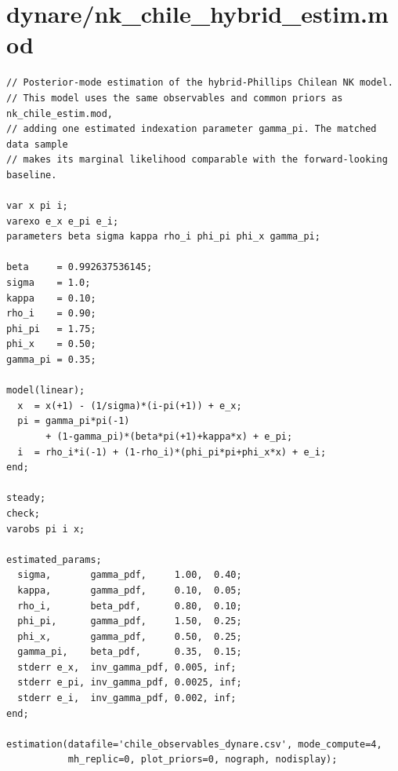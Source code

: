 \documentclass[9pt]{extarticle}
\begin{document}
\section{dynare/nk\_chile\_hybrid\_estim.mod}
\begin{lstlisting}[language={}]
// Posterior-mode estimation of the hybrid-Phillips Chilean NK model.
// This model uses the same observables and common priors as nk_chile_estim.mod,
// adding one estimated indexation parameter gamma_pi. The matched data sample
// makes its marginal likelihood comparable with the forward-looking baseline.

var x pi i;
varexo e_x e_pi e_i;
parameters beta sigma kappa rho_i phi_pi phi_x gamma_pi;

beta     = 0.992637536145;
sigma    = 1.0;
kappa    = 0.10;
rho_i    = 0.90;
phi_pi   = 1.75;
phi_x    = 0.50;
gamma_pi = 0.35;

model(linear);
  x  = x(+1) - (1/sigma)*(i-pi(+1)) + e_x;
  pi = gamma_pi*pi(-1)
       + (1-gamma_pi)*(beta*pi(+1)+kappa*x) + e_pi;
  i  = rho_i*i(-1) + (1-rho_i)*(phi_pi*pi+phi_x*x) + e_i;
end;

steady;
check;
varobs pi i x;

estimated_params;
  sigma,       gamma_pdf,     1.00,  0.40;
  kappa,       gamma_pdf,     0.10,  0.05;
  rho_i,       beta_pdf,      0.80,  0.10;
  phi_pi,      gamma_pdf,     1.50,  0.25;
  phi_x,       gamma_pdf,     0.50,  0.25;
  gamma_pi,    beta_pdf,      0.35,  0.15;
  stderr e_x,  inv_gamma_pdf, 0.005, inf;
  stderr e_pi, inv_gamma_pdf, 0.0025, inf;
  stderr e_i,  inv_gamma_pdf, 0.002, inf;
end;

estimation(datafile='chile_observables_dynare.csv', mode_compute=4,
           mh_replic=0, plot_priors=0, nograph, nodisplay);
\end{lstlisting}
\clearpage
\end{document}
